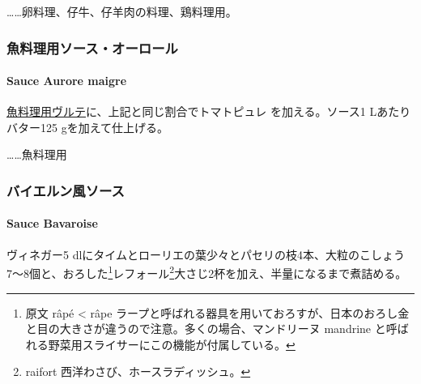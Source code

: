 \begin{recette}
\ldots{}\ldots{}卵料理、仔牛、仔羊肉の料理、鶏料理用。

\maeaki

\hypertarget{ux9b5aux6599ux7406ux7528ux30bdux30fcux30b9ux30aaux30fcux30edux30fcux30eb}{%
\subsubsection{魚料理用ソース・オーロール}\label{ux9b5aux6599ux7406ux7528ux30bdux30fcux30b9ux30aaux30fcux30edux30fcux30eb}}

\hypertarget{sauce-aurore-maigre}{%
\paragraph{Sauce Aurore maigre}\label{sauce-aurore-maigre}}


\protect\hyperlink{veloute-de-poisson}{魚料理用ヴルテ}に、上記と同じ割合でトマトピュレ
を加える。ソース1 Lあたりバター125 gを加えて仕上げる。

\ldots{}\ldots{}魚料理用

\maeaki

\hypertarget{ux30d0ux30a4ux30a8ux30ebux30f3ux98a8ux30bdux30fcux30b9}{%
\subsubsection{バイエルン風ソース}\label{ux30d0ux30a4ux30a8ux30ebux30f3ux98a8ux30bdux30fcux30b9}}

\hypertarget{sauce-bavaroise}{%
\paragraph{Sauce Bavaroise}\label{sauce-bavaroise}}


ヴィネガー5
dlにタイムとローリエの葉少々とパセリの枝4本、大粒のこしょう7〜8個と、おろした\footnote{原文
  râpé \textless{} râpe
  ラープと呼ばれる器具を用いておろすが、日本のおろし金と目の大きさが違うので注意。多くの場合、マンドリーヌ
  mandrine と呼ばれる野菜用スライサーにこの機能が付属している。}レフォール\footnote{raifort
  西洋わさび、ホースラディッシュ。}大さじ2杯を加え、半量になるまで煮詰める。


\end{recette}
